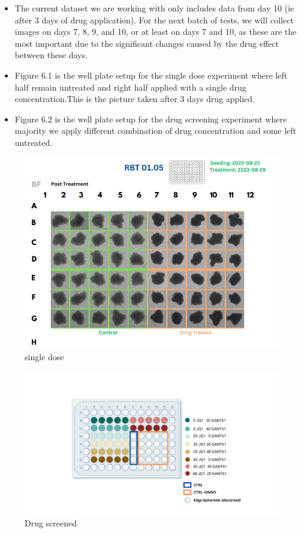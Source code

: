 \documentclass[12pt,twoside,a4paper,parskip]{scrbook} %
\begin{document}
\begin{itemize}
  \item The current dataset we are working with only includes data from day 10 (ie after 3 days of drug application). For the next batch of tests, we will collect images on days 7, 8, 9, and 10, or at least on days 7 and 10, as these are the most important due to the significant changes caused by the drug effect between these days.
  \item Figure 6.1 is the well plate setup for the single dose experiment where left half remain untreated and right half applied with a single drug concentration.This is the picture taken after 3 days drug applied.
  \item Figure 6.2 is the well plate setup for the drug screening experiment where majority we apply different combination of drug concentration and some left untreated.
\end{itemize}

\begin{figure}[H]
  \centering
  \includegraphics[width=0.9\linewidth]{figures/single_dose.jpg} %
  \caption{single dose}
  \label{fig:output1}
\end{figure}

\begin{figure}[H]
  \centering
  \includegraphics[width=0.9\linewidth]{figures/drug_screened.png} %
  \caption{Drug screened}
  \label{fig:output1}
\end{figure}
\end{document}
